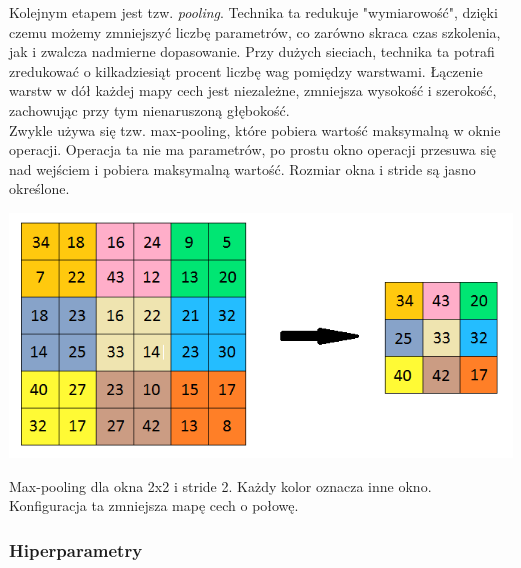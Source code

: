 \documentclass[12pt,a4paper]{article}
\begin{document}
    Kolejnym etapem jest tzw. \textit{pooling}. Technika ta redukuje "wymiarowość", dzięki czemu możemy zmniejszyć liczbę parametrów, co zarówno skraca czas szkolenia, jak i zwalcza nadmierne dopasowanie. Przy dużych sieciach, technika ta potrafi zredukować o kilkadziesiąt procent liczbę wag pomiędzy warstwami. Łączenie warstw w dół każdej mapy cech jest niezależne, zmniejsza wysokość i szerokość, zachowując przy tym nienaruszoną głębokość.
    \\
    
    Zwykle używa się tzw. max-pooling, które pobiera wartość maksymalną w oknie operacji. Operacja ta nie ma parametrów, po prostu okno operacji przesuwa się nad wejściem i  pobiera maksymalną wartość. Rozmiar okna i stride są jasno określone.
    \begin{center}
        \includegraphics[scale=0.52]{max-pool.png}
        \begin{flushright}
            \begin{scriptsize}
            Max-pooling dla okna 2x2 i stride 2. Każdy kolor oznacza inne okno. Konfiguracja ta zmniejsza mapę cech o połowę.
            \end{scriptsize}
        \end{flushright}
    \end{center}
    
    \subsubsection{Hiperparametry}
    
\end{document}

